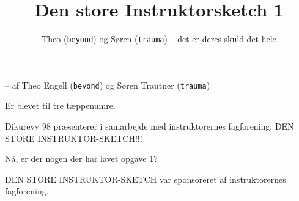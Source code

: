 \documentclass[danish]{article}
\title{Den store Instruktorsketch 1}
\author{Theo (\texttt{beyond}) og Søren (\texttt{trauma}) -- det er deres skuld det hele}
\begin{document}
\maketitle

\begin{sketch}

-- af Theo Engell (\texttt{beyond}) og Søren Trautner (\texttt{trauma})

Er blevet til tre tæppenumre.

\begin{roles}
\end{roles}

 Dikurevy 98 præsenterer i samarbejde med instruktorernes
fagforening: DEN STORE INSTRUKTOR-SKETCH!!!


 Nå, er der nogen der har lavet opgave 1?




 DEN STORE INSTRUKTOR-SKETCH var sponsoreret af instruktorernes
fagforening.

\end{sketch}
\end{document}
